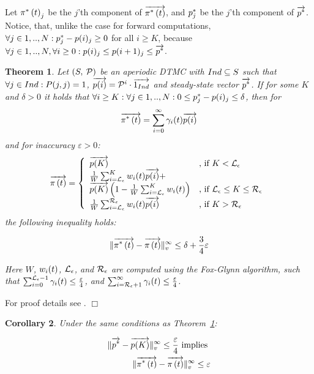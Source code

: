 \documentclass[times, 10pt,twocolumn]{article}
\newtheorem{theorem}{Theorem}
\newtheorem{corollary}[theorem]{Corollary}
\newenvironment{proof}{\trivlist \item[\hskip \labelsep{\bf Proof}]}{\hfill\hbox{$\Box$}\endtrivlist}
\begin{document}
		
		Let $\pi^{*} \left( t \right)_{j}$ be the $j$'th component of $\overrightarrow{\pi^{*} \left( t \right)}$, and $p^{*}_{j}$ be the $j$'th component of $\overrightarrow{p^{*}}$.  Notice, that, unlike the case for forward computations, $\forall j \in 1,..,N : p^{*}_{j} - p(i)_{j} \geq 0$ for all $i \geq K$, because $\forall j \in 1,..,N, \forall i\geq0 : p(i)_{j} \leq p(i+1)_{j} \leq \overrightarrow{p^{*}}$.
		
		\begin{theorem}
			Let $\left( S,\: \mathcal{P} \right)$ be an aperiodic DTMC with $Ind \subseteq S$ such that $\forall j \in Ind : P(j,j) = 1$, $\overrightarrow{p(i)}=\mathcal{P}^{i} \cdot \overrightarrow{1_{Ind}}$ and steady-state vector $\overrightarrow{p^{*}}$. If for some $K$ and $\delta > 0$ it holds that $\forall i \geq K : \forall j \in 1,..,N : 0 \leq p^{*}_{j} - p(i)_{j} \leq \delta$, then for 
			{\small
			\[
				\overrightarrow{\pi^{*} \left( t \right)} = \sum_{i=0}^{\infty}\gamma_{i}(t) \overrightarrow{p(i)}
			\]
			}
			and for inaccuracy $\varepsilon > 0$:
			{\small
			\begin{equation}
				\displaystyle
				\overrightarrow{\pi \left( t \right) } = \left\{
				\begin{array}{ll}
					\overrightarrow{p(K)} & \text{, if } K < \mathcal{L}_{\epsilon}\\
					\frac{1}{W} \sum_{i=\mathcal{L}_{\epsilon}}^{K}w_{i}(t) \overrightarrow{p(i)} + & \\
					\overrightarrow{p(K)} \left(1- \frac{1}{W} \sum_{i=\mathcal{L}_{\epsilon}}^{K}w_{i}(t) \right) & \text{, if } \mathcal{L}_{\epsilon} \leq K \leq \mathcal{R}_{\epsilon}\\
					\frac{1}{W} \sum_{i=\mathcal{L}_{\epsilon}}^{\mathcal{R}_{\epsilon}}w_{i}(t) \overrightarrow{p(i)} & \text{, if } K > \mathcal{R}_{\epsilon}\\
				\end{array}
				\right .
				\nonumber
			\end{equation}
			}
			the following inequality holds:
			{\small
			\begin{fframe}{0.5}{-0.3}
				\[
					\lVert   \overrightarrow{\pi^{*} \left( t \right)} - \overrightarrow{\pi \left( t \right) }   \rVert_{v}^{\infty} \leq \delta + \frac{3}{4} \varepsilon
				\]
			\end{fframe}
			}
			Here $W$, $w_{i}(t)$, $\mathcal{L}_{\epsilon}$, and $\mathcal{R}_{\epsilon}$ are computed using the Fox-Glynn algorithm, such that $\sum_{i=0}^{\mathcal{L}_{\epsilon}-1} \gamma_{i}(t) \leq \frac{\varepsilon}{4}$, and $\sum_{i=\mathcal{R}_{\epsilon}+1}^{\infty} \gamma_{i}(t) \leq \frac{\varepsilon}{4}$.
			\label{th:error_bwd}
		\end{theorem}
		\begin{proof}
			For proof details see \cite{KatoenZ_TR05}.
		\end{proof}

		\begin{corollary}
			Under the same conditions as Theorem~\ref{th:error_bwd}:
			{\small
			\begin{fframe}{0.6}{-0.3}
				\begin{eqnarray}
					\lVert  \overrightarrow{p^{*}} - \overrightarrow{p(K)}  \rVert_{v}^{\infty} \leq \frac{\varepsilon}{4} \text{ implies } \nonumber \\
					\lVert  \overrightarrow{\pi^{*} \left( t \right)} - \overrightarrow{\pi \left( t \right) }  \rVert_{v}^{\infty}\leq \varepsilon
					\label{eq:our_bwd_cor}
				\end{eqnarray}
			\end{fframe}
			}
		 \end{corollary}
		
\end{document}
